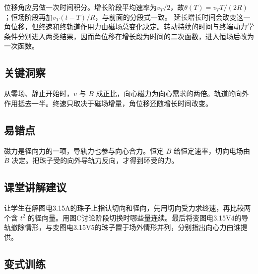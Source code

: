 \documentclass[UTF8,fontset=fandol,a4paper,11pt]{ctexart}
\begin{document}
位移角应另做一次时间积分。增长阶段平均速率为$v_T/2$，故$\theta(T)=v_TT/(2R)$；恒场阶段再加$v_T(t-T)/R$，与前面的分段式一致。
延长增长时间会改变这一角位移，但终速和终轨道作用力由磁场总变化决定。转动持续的时间与终端动力学条件分别进入两类结果，因而角位移在增长段为时间的二次函数，进入恒场后改为一次函数。




\subsection*{关键洞察}

从零场、静止开始时，$v$ 与 $B$ 成正比，向心磁力为向心需求的两倍。轨道的向外作用抵去一半。终速只取决于磁场增量，角位移还随增长时间改变。



\subsection*{易错点}

磁力是径向力的一项，导轨力也参与向心合力。恒定 $B$ 给恒定速率，切向电场由 $\dot B$ 决定。把珠子受的向外导轨力反向，才得到环受的力。



\subsection*{课堂讲解建议}

让学生在解图电3.15A的珠子上指认切向和径向，先用切向受力求终速，再比较两个含 $t^2$ 的径向量。用图C讨论阶段切换时哪些量连续。最后将变图电3.15V4的导轨撤除情形，与变图电3.15V5的珠子置于场外情形并列，分别指出向心力由谁提供。


\subsection*{变式训练}
\end{document}
